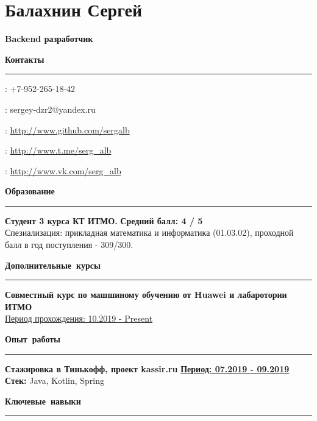 \documentclass[11pt,a4paper]{report}
\author{Балахнин Сергей}
\begin{document}
    \section*{Балахнин Сергей}

    \par{\Large\textbf{Backend разработчик}}

    \hbox{\Large\textbf{Контакты}}\kern5pt\hrule\kern5pt

    \faPhone: +7-952-265-18-42

    \Letter: sergey-dzr2@yandex.ru

    \faGithub: \url{http://www.github.com/sergalb}

    \faSend: \url{http://www.t.me/serg\_alb}

    \faVk: \url{http://www.vk.com/serg_alb}


    \par\hbox{\Large\textbf{Образование}}\kern5pt\hrule\kern5pt

    \textbf{Студент 3 курса КТ ИТМО.}
    \hfill
    \textbf{\Large Средний балл: 4 / 5} \\
    Спезиализация: прикладная математика и информатика (01.03.02), проходной балл в год поступления - 309/300.\\

    \par\hbox{\Large\textbf{Дополнительные курсы}}\kern5pt\hrule\kern5pt
    \textbf{Совместный курс по машшиному обучению от Huawei и лабаротории ИТМО}
    \\
    \underline{Период прохождения: 10.2019 - Present} \\


    \par\hbox{\Large\textbf{Опыт работы}}\kern3pt\hrule\kern10pt

    \textbf {Стажировка в Тинькофф, проект kassir.ru }
    \hfill
    \textbf {\underline{Период: 07.2019 - 09.2019}} \\
    \textbf{Стек:} Java, Kotlin, Spring \\


    \par\hbox{\Large\textbf{Ключевые навыки}}\kern5pt\hrule\kern5pt
\end{document}
